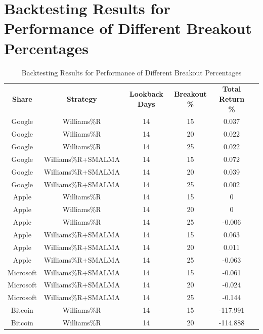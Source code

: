 \section{Backtesting Results for Performance of Different Breakout Percentages}

\begin{table}[h!]
\centering
\caption{Backtesting Results for Performance of Different Breakout Percentages}
\label{table:backtesting4}
\begin{tabular}{|c|c|c|c|c|c|}
\hline
\textbf{Share} & \textbf{Strategy} & \textbf{Lookback Days} & \textbf{Breakout \%} & \textbf{Total Return \%} \\

Google & Williams\%R & 14 & 15 & 0.037 \\
Google & Williams\%R & 14 & 20 & 0.022 \\

Google & Williams\%R & 14 & 25 & 0.022 \\

Google & Williams\%R+SMALMA & 14 & 15 & 0.072 \\
Google & Williams\%R+SMALMA & 14 & 20 & 0.039 \\

Google & Williams\%R+SMALMA & 14 & 25 & 0.002 \\

Apple & Williams\%R & 14 & 15 & 0 \\
Apple & Williams\%R & 14 & 20 & 0 \\

Apple & Williams\%R & 14 & 25 & -0.006 \\

Apple & Williams\%R+SMALMA & 14 & 15 & 0.063 \\
Apple & Williams\%R+SMALMA & 14 & 20 & 0.011 \\

Apple & Williams\%R+SMALMA & 14 & 25 & -0.063 \\



Microsoft & Williams\%R+SMALMA & 14 & 15 & -0.061 \\
Microsoft & Williams\%R+SMALMA & 14 & 20 & -0.024 \\

Microsoft & Williams\%R+SMALMA & 14 & 25 & -0.144 \\

Bitcoin & Williams\%R & 14 & 15 & -117.991 \\
Bitcoin & Williams\%R & 14 & 20 & -114.888 \\


\end{tabular}
\end{table}
